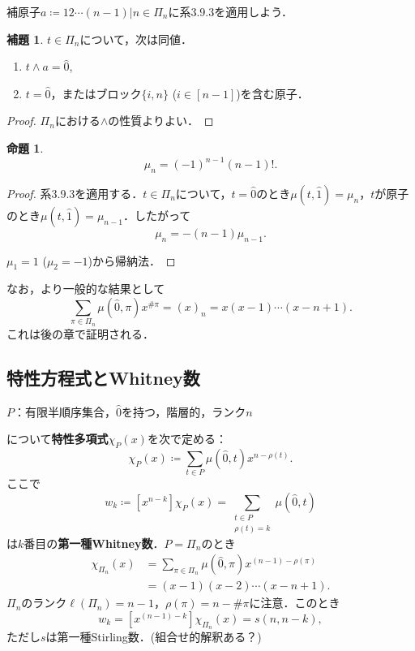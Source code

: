 \documentclass[xelatex,ja=standard,a4paper,14pt,everyparhook=compat]{bxjsarticle}
\theoremstyle{definition}
\newtheorem*{lemma*}{補題}
\newtheorem*{proposition*}{命題}
\begin{document}
補原子$a \coloneqq 12\cdots(n-1) | n \in \Pi_n$に系3.9.3を適用しよう．

\begin{lemma*}
    $t \in \Pi_n$について，次は同値． \begin{enumerate}
        \item $t \land a = \hat0$,
        \item $t = \hat0$，またはブロック$\{i,n\}$ ($i \in [n-1]$)を含む原子．
    \end{enumerate}
\end{lemma*}
\begin{proof}
    $\Pi_n$における$\land$の性質よりよい．
\end{proof}

\begin{proposition*}
    \begin{equation*}
        \mu_n = (-1)^{n-1}(n-1)!.
    \end{equation*}
\end{proposition*}
\begin{proof}
    系3.9.3を適用する．$t \in \Pi_n$について，$t = \hat0$のとき$\mu(t,\hat1) = \mu_n$，$t$が原子のとき$\mu(t,\hat1) = \mu_{n-1}$．したがって \begin{equation*}
        \mu_n = -(n-1)\mu_{n-1}.
    \end{equation*}

    $\mu_1 = 1$ ($\mu_2 = -1$)から帰納法．
\end{proof}

なお，より一般的な結果として \begin{equation*}
    \sum_{\pi \in \Pi_n} \mu(\hat0,\pi) x^{\#\pi} = (x)_n = x(x-1)\cdots(x-n+1).
\end{equation*}
これは後の章で証明される．

\subsection{特性方程式とWhitney数}

$P$：有限半順序集合，$\hat0$を持つ，階層的，ランク$n$

について\textbf{特性多項式}$\chi_P(x)$を次で定める： \begin{equation*}
    \chi_P(x) \coloneqq \sum_{t \in P} \mu(\hat0, t) x^{n-\rho(t)}.
\end{equation*}
ここで \begin{equation*}
    w_k \coloneqq [x^{n-k}]\chi_P(x) = \sum_{\substack{t \in P \\ \rho(t) = k}} \mu(\hat0,t)
\end{equation*}
は$k$番目の\textbf{第一種Whitney数}．$P=\Pi_n$のとき \begin{align*}
    \chi_{\Pi_n}(x) & = \sum_{\pi \in \Pi_n} \mu(\hat0,\pi)x^{(n-1)-\rho(\pi)} \\
                    & = (x-1)(x-2)\cdots(x-n+1).
\end{align*}
$\Pi_n$のランク$\ell(\Pi_n) = n-1$，$\rho(\pi) = n - \#\pi$に注意．このとき \begin{equation*}
    w_k = [x^{(n-1)-k}]\chi_{\Pi_n}(x) = s(n,n-k),
\end{equation*}
ただし$s$は第一種Stirling数．(組合せ的解釈ある？)
\end{document}
